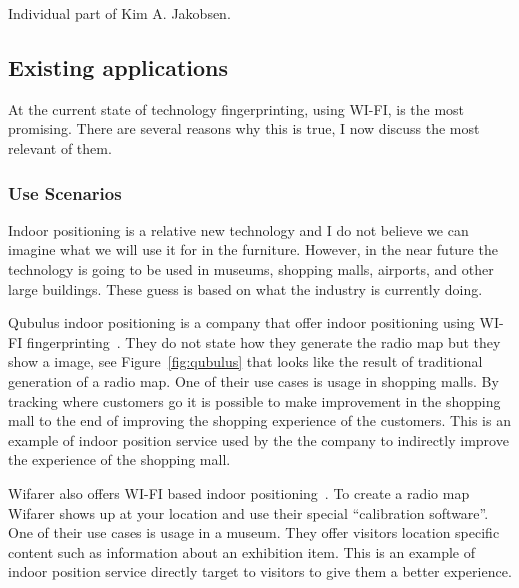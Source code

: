 Individual part of Kim A. Jakobsen.

\subsection{Existing applications}
At the current state of technology fingerprinting, using WI-FI, is the most promising.
There are several reasons why this is true, I now discuss the most relevant of them.

\subsubsection{\qquad Use Scenarios} 
Indoor positioning is a relative new technology and I do not believe we can imagine what we will use it for in the furniture.
However, in the near future the technology is going to be used in museums, shopping malls, airports, and other large buildings.
These guess is based on what the industry is currently doing.

Qubulus indoor positioning is a company that offer indoor positioning using WI-FI fingerprinting~\cite{qubulus}.
They do not state how they generate the radio map but they show a image, see Figure~\ref{fig:qubulus} that looks like the result of traditional generation of a radio map.
One of their use cases is usage in shopping malls.
By tracking where customers go it is possible to make improvement in the shopping mall to the end of improving the shopping experience of the customers.
This is an example of indoor position service used by the the company to indirectly improve the experience of the shopping mall.

Wifarer also offers WI-FI based indoor positioning~\cite{wifarer}.
To create a radio map Wifarer shows up at your location and use their special "`calibration software"'.
One of their use cases is usage in a museum.
They offer visitors location specific content such as information about an exhibition item.
This is an example of indoor position service directly target to visitors to give them a better experience.


